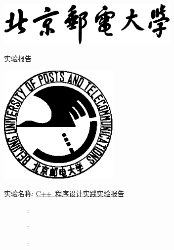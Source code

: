 \begin{titlepage}
    \center
    \includegraphics[width=3.5in]{images/buptname.eps}

    \begin{spacing}{5}
        {\bigsize 实验报告}
    \end{spacing}

    \includegraphics[width=2.3in]{images/buptseal.eps}

    \begin{spacing}{1}
        \vspace{2.5cm}
        \Large 实验名称: \underline{C++~程序设计实践实验报告}
        \vspace{3cm}
    \end{spacing}

    \begin{minipage}{0.32\linewidth}
         : \underline{}

         : \underline{}

         : \underline{}


    \end{minipage}

\end{titlepage}

